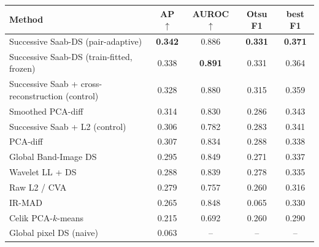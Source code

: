 \documentclass[border=8pt]{standalone}
\newcommand{\B}[1]{\textbf{\textcolor{best}{#1}}}
\begin{document}
\begin{tabular}{l c c c c}
\toprule
\textbf{Method} & \textbf{AP} $\uparrow$ & \textbf{AUROC} $\uparrow$ & \textbf{Otsu F1} & \textbf{best F1} \\
\midrule
\rowcolor{win} Successive Saab-DS (pair-adaptive)      & \B{0.342} & 0.886 & \B{0.331} & \B{0.371} \\
\rowcolor{win} Successive Saab-DS (train-fitted, frozen) & 0.338 & \B{0.891} & 0.331 & 0.364 \\
Successive Saab + cross-reconstruction (control)        & 0.328 & 0.880 & 0.315 & 0.359 \\
Smoothed PCA-diff                                       & 0.314 & 0.830 & 0.286 & 0.343 \\
Successive Saab + L2 (control)                          & 0.306 & 0.782 & 0.283 & 0.341 \\
PCA-diff                                                & 0.307 & 0.834 & 0.288 & 0.338 \\
Global Band-Image DS                                   & 0.295 & 0.849 & 0.271 & 0.337 \\
Wavelet LL + DS                                         & 0.288 & 0.839 & 0.278 & 0.335 \\
Raw L2 / CVA                                            & 0.279 & 0.757 & 0.260 & 0.316 \\
IR-MAD                                                 & 0.265 & 0.848 & 0.065 & 0.330 \\
Celik PCA-$k$-means                                    & 0.215 & 0.692 & 0.260 & 0.290 \\
Global pixel DS (naive)                                & 0.063 & --    & --    & --    \\
\bottomrule
\end{tabular}
\end{document}
